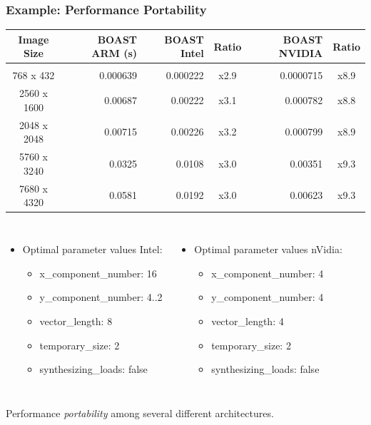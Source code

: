 \documentclass{beamer}
\begin{document}
\begin{frame}
  \frametitle{Example: Performance Portability}
  \begin{center}
  \scriptsize
  \begin{tabular}{c|r|r|c|r|c}
    Image Size & BOAST ARM (s) & BOAST Intel & Ratio & BOAST NVIDIA & Ratio \\
    \hline&&&&\\
  768 x 432   & 0.000639     & 0.000222    & x2.9  & 0.0000715    & x8.9  \\
  2560 x 1600 & 0.00687      & 0.00222     & x3.1  & 0.000782     & x8.8  \\
  2048 x 2048 & 0.00715      & 0.00226     & x3.2  & 0.000799     & x8.9  \\
  5760 x 3240 & 0.0325       & 0.0108      & x3.0  & 0.00351      & x9.3  \\
  7680 x 4320 & 0.0581       & 0.0192      & x3.0  & 0.00623      & x9.3
  \end{tabular}
  \end{center}

  \begin{columns}
  \begin{itemize}
    \item \footnotesize Optimal parameter values Intel:
    \begin{itemize}
      \item \scriptsize x\_component\_number: 16
      \item \scriptsize y\_component\_number: 4..2
      \item \scriptsize vector\_length: 8
      \item \scriptsize temporary\_size: 2
      \item \scriptsize synthesizing\_loads: false
    \end{itemize}
  \end{itemize}
  \begin{itemize}
    \item \footnotesize Optimal parameter values nVidia:
    \begin{itemize}
      \item \scriptsize x\_component\_number: 4
      \item \scriptsize y\_component\_number: 4
      \item \scriptsize vector\_length: 4
      \item \scriptsize temporary\_size: 2
      \item \scriptsize synthesizing\_loads: false
    \end{itemize}
  \end{itemize}
  \end{columns}
  \vspace{1cm}
  \centering Performance \emph{portability} among several different architectures.
\end{frame}
\end{document}
